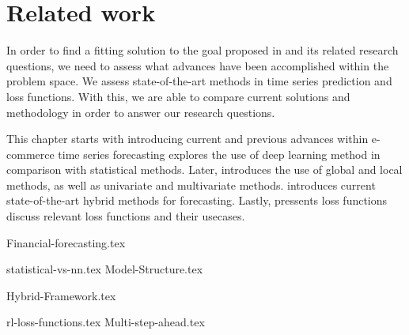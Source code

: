 \chapter{Related work}
\label{section:RelatedWork}

\iffalse
Our problem can be composed into two main categories.
time series forecasting, and e-commerce trend forecasting.
What is the characteristics of e-commerce trend forecasting?
The domain consists of multiple time series, some which correlate.
The time series contains multiple periods, for example users shop
online ofter on sundays than on mondays. 
Some categories are popular in the spring, others in the fall.
Mabye online shopping spikes around common paydays?
\fi


In order to find a fitting solution to the goal proposed in  and its related research questions,
we need to assess what advances have been accomplished within the problem space.
We assess state-of-the-art methods in time series prediction and loss functions.
With this, we are able to compare current solutions and methodology in order to answer our research questions.

This chapter starts with  introducing current and previous advances within e-commerce time series forecasting
 explores the use of deep learning method in comparison with statistical methods.
Later,  introduces the use of global and local methods, as well as univariate and multivariate methods.
 introduces current state-of-the-art hybrid methods for forecasting.
Lastly,  pressents loss functions discuss relevant loss functions and their usecases.



{Financial-forecasting.tex}

{statistical-vs-nn.tex}
{Model-Structure.tex}

{Hybrid-Framework.tex}

{rl-loss-functions.tex}
{Multi-step-ahead.tex}
